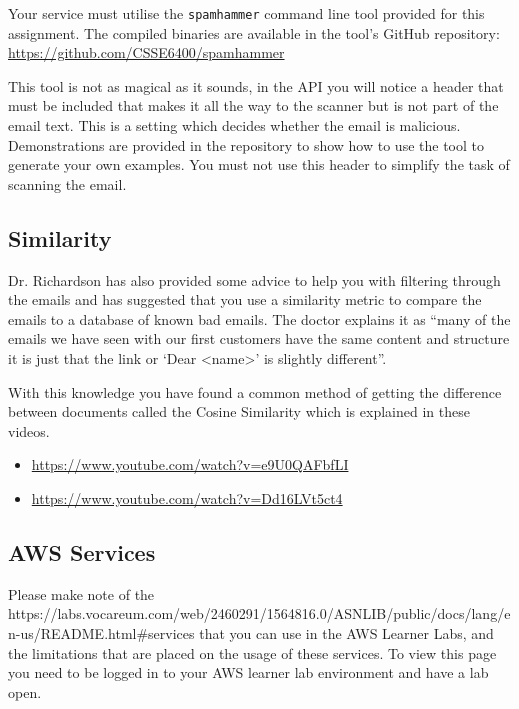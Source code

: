 \documentclass{csse4400}
\begin{document}
Your service must utilise the \texttt{spamhammer} command line tool provided for this assignment. The compiled binaries are available in the tool's GitHub repository: \url{https://github.com/CSSE6400/spamhammer}


This tool is not as magical as it sounds, in the API you will notice a header that must be included that makes it all the way to the scanner but is not part of the email text. This is a setting which decides whether the email is malicious. Demonstrations are provided in the repository to show how to use the tool to generate your own examples. You must not use this header to simplify the task of scanning the email.

\subsection{Similarity}

Dr. Richardson has also provided some advice to help you with filtering through the emails and has suggested that you use a similarity metric to compare the emails to a database of known bad emails. The doctor explains it as ``many of the emails we have seen with our first customers have the same content and structure it is just that the link or `Dear <name>' is slightly different''.

With this knowledge you have found a common method of getting the difference between documents called the Cosine Similarity which is explained in these videos.

\begin{itemize}
  \item \url{https://www.youtube.com/watch?v=e9U0QAFbfLI}
  \item \url{https://www.youtube.com/watch?v=Dd16LVt5ct4}
\end{itemize}


\subsection{AWS Services}
Please make note of the 
{https://labs.vocareum.com/web/2460291/1564816.0/ASNLIB/public/docs/lang/en-us/README.html\#services}
that you can use in the AWS Learner Labs, and the limitations that are placed on the usage of these services.
To view this page you need to be logged in to your AWS learner lab environment and have a lab open.
\end{document}
